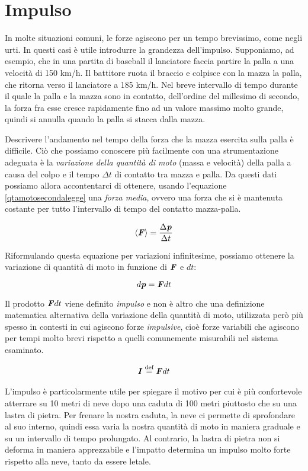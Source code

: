 \section{Impulso}
In molte situazioni comuni, le forze agiscono per un tempo brevissimo, come
negli urti. In questi casi è utile introdurre la grandezza dell'impulso.
Supponiamo, ad esempio, che in una partita di baseball il lanciatore faccia
partire la palla a una velocità di 150 km/h. Il battitore ruota il braccio
e colpisce con la mazza la palla, che ritorna verso il lanciatore a 185 km/h.
Nel breve intervallo di tempo durante il quale la palla e la mazza sono in
contatto, dell'ordine del millesimo di secondo, la forza fra esse cresce
rapidamente fino ad un valore massimo molto grande, quindi si annulla quando
la palla si stacca dalla mazza.

Descrivere l'andamento nel tempo della forza che la mazza esercita sulla palla è
difficile. Ciò che possiamo conoscere più facilmente con una strumentazione
adeguata è la \textit{variazione della quantità di moto} (massa e velocità) della
palla a causa del colpo e il tempo $\Delta t$ di contatto tra mazza e palla. Da questi
dati possiamo allora accontentarci di ottenere, usando l'equazione \ref{qtamotosecondalegge} una \textit{forza media}, ovvero
una forza che si è mantenuta costante per tutto l'intervallo di tempo del contatto
mazza-palla.

\[ \left\langle \textbf{\textit{F}}\right\rangle  = \frac{\Delta\textbf{\textit{p}}}{\Delta t} \]

\noindent Riformulando questa equazione per variazioni infinitesime, possiamo
ottenere la variazione di quantità di moto in funzione di $\textbf{\textit{F}}$ e $dt$:

\[ d\textbf{\textit{p}} = \textbf{\textit{F}}dt \]

\noindent Il prodotto $\textbf{\textit{F}}dt$ viene definito \textit{impulso} e non è
altro che una definizione matematica alternativa della variazione della quantità
di moto, utilizzata però più spesso in contesti in cui agiscono forze \textit{impulsive},
cioè forze variabili che agiscono per tempi molto brevi rispetto a quelli
comunemente misurabili nel sistema esaminato.

\begin{align}
    \textbf{\textit{I}} \stackrel{\text{def}}{=} \textbf{\textit{F}}dt\label{impulso}
\end{align}

\noindent L'impulso è particolarmente utile per spiegare il motivo per cui
è più confortevole atterrare su 10 metri di neve dopo una caduta di 100 metri
piuttosto che su una lastra di pietra. Per frenare la nostra caduta, la neve
ci permette di sprofondare al suo interno, quindi essa varia la nostra quantità
di moto in maniera graduale e su un intervallo di tempo prolungato. Al contrario,
la lastra di pietra non si deforma in maniera apprezzabile e l'impatto determina
un impulso molto forte rispetto alla neve, tanto da essere letale.


